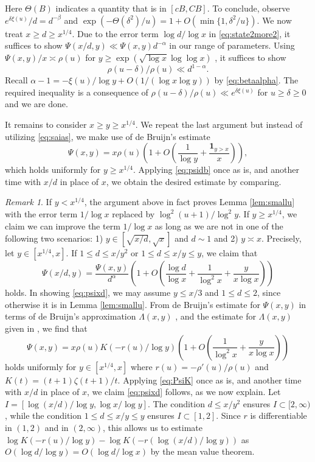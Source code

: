\documentclass{amsart}
\theoremstyle{plain}
\theoremstyle{remark}
\newtheorem{rem}{Remark}
\begin{document}
Here $\Theta(B)$ indicates a quantity that is in $[cB,CB]$. To conclude, observe $e^{\delta\xi(u)}/d=d^{-\beta}$ and $\exp(-\Theta(\delta^2)/u)=1+O(\min\{1,\delta^2/u\})$. We now treat $x \ge d \ge x^{1/4}$. Due to the error term $\log d /\log x$ in \eqref{eq:state2more2}, it suffices to show $\Psi(x/d,y) \ll \Psi(x,y)d^{-\alpha}$ in our range of parameters. Using $\Psi(x,y)/x \asymp \rho(u)$ for $y \ge \exp(\sqrt{\log x} \log \log x)$ \cite{db}, it suffices to show \[ \rho(u-\delta)/\rho(u)\ll d^{1-\alpha}.\]
Recall $\alpha-1 = -\xi(u)/\log y + O(1/(\log x \log y))$ by \eqref{eq:betaalpha}. The required inequality is a consequence of $\rho(u-\delta)/\rho(u)\ll e^{\delta \xi(u)}$ for $u\ge \delta \ge 0$ \cite[Cor.~2.4]{HT1993} and we are done.

It remains to consider $x \ge y \ge x^{1/4}$. We repeat the last argument but  instead of utilizing \eqref{eq:saias}, we make use of  de Bruijn's estimate \cite{db}
\begin{equation}\label{eq:psidb}
	\Psi(x,y) = x\rho(u) \left(1 + O\left(\frac{1}{\log y} + \frac{\mathbf{1}_{y > x}}{x}\right)\right),
\end{equation}
which holds uniformly for $y \ge x^{1/4}$. Applying \eqref{eq:psidb} once as is, and another time with $x/d$ in place of $x$, we obtain the desired estimate by comparing.
\begin{rem}\label{rem:smallu}
	If $y<x^{1/4}$, the argument above in fact proves Lemma \ref{lem:smallu} with the error term $1/\log x$ replaced by $\log^2(u+1)/\log^2 y$. If $y \ge x^{1/4}$, we claim we can improve the term $1/\log x$ as long as we are not in one of the following two scenarios: 1) $y \in [\sqrt{x/d},\sqrt{x}]$ and $d \sim 1$ and 2) $y \asymp x$. Precisely, let $y \in [x^{1/4},x]$. If $1 \le d \le x/y^2$ or $1 \le d \le x/y\le y$, we claim that
	\begin{equation}\label{eq:psixd}
		\Psi(x/d,y) = \frac{\Psi(x,y)}{d^{\alpha}}\left(1 + O\left( \frac{\log d}{\log x} + \frac{1}{\log^2 x} +\frac{y}{x\log x} \right)\right)
	\end{equation}
	holds. In showing \eqref{eq:psixd}, we may assume $y\le x/3$ and $1 \le d \le 2$, since otherwise it is in Lemma \ref{lem:smallu}. From de Bruijn's estimate for $\Psi(x,y)$ in terms of de Bruijn's approximation $\Lambda(x,y)$ \cite{db}, and the estimate for $\Lambda(x,y)$ given in  \cite[Prop.~A.5]{Gorodetsky}, we find that
	\begin{equation}\label{eq:PsiK} \Psi(x,y) = x \rho(u) K(-r(u)/\log y)\left(1+O\left( \frac{1}{\log^2 x} + \frac{y}{x \log x}\right)\right)
	\end{equation}
	holds uniformly for $y \in [x^{1/4},x]$ where $r(u)=-\rho'(u)/\rho(u)$ and $K(t)= (t+1)\zeta(t+1)/t$. Applying \eqref{eq:PsiK} once as is, and another time with $x/d$ in place of $x$, we claim \eqref{eq:psixd} follows, as we now explain. Let $I=[\log(x/d)/\log y, \log x /\log y]$. The condition $d\le x/y^2$ ensures $I \subset [2,\infty)$, while the condition $1 \le d\le x/y\le y$ ensures $I \subset [1,2]$. Since $r$ is differentiable in $(1,2)$ and in $(2,\infty)$, this allows us to estimate $\log K(-r(u)/\log y)-\log K(-r(\log(x/d)/\log y))$ as $O( \log d/\log y)=O(\log d/\log x)$ by the mean value theorem.
\end{rem}
\end{document}
